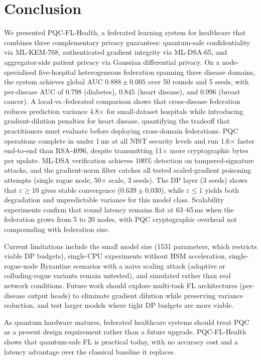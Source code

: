 \documentclass[runningheads]{llncs}
\begin{document}
\section{Conclusion}
\label{sec:conclusion}

We presented PQC-FL-Health, a federated learning system for healthcare
that combines three complementary privacy guarantees: quantum-safe
confidentiality via ML-KEM-768, authenticated gradient integrity via
ML-DSA-65, and aggregator-side patient privacy via Gaussian
differential privacy.
On a node-specialised five-hospital heterogeneous federation spanning
three disease domains, the system achieves global AUC
$0.888 \pm 0.005$ over 50 rounds and 5 seeds, with per-disease AUC
of $0.798$ (diabetes), $0.845$ (heart disease), and $0.996$ (breast
cancer).
A local-vs.-federated comparison shows that cross-disease federation
reduces prediction variance 4.8$\times$ for small-dataset hospitals
while introducing gradient-dilution penalties for heart disease,
quantifying the tradeoff that practitioners must evaluate before
deploying cross-domain federations.
PQC operations complete in under 1\,ms at all NIST security levels
and run 1.6$\times$ faster end-to-end than RSA-4096, despite
transmitting 11$\times$ more cryptographic bytes per update.
ML-DSA verification achieves 100\% detection on tampered-signature
attacks, and the gradient-norm filter catches all tested scaled-gradient
poisoning attempts (single rogue node, 50$\times$ scale, 3 seeds).
The DP layer (3 seeds) shows that $\varepsilon \ge 10$ gives stable
convergence ($0.639 \pm 0.030$), while $\varepsilon \le 1$ yields
both degradation and unpredictable variance for this model class.
Scalability experiments confirm that round latency remains flat at
63--65\,ms when the federation grows from 5 to 20 nodes, with PQC
cryptographic overhead not compounding with federation size.

Current limitations include the small model size (1531 parameters,
which restricts viable DP budgets), single-CPU experiments without
HSM acceleration, single-rogue-node Byzantine scenarios with a
naive scaling attack (adaptive or colluding-rogue variants remain
untested), and simulated rather than real network conditions.
Future work should explore multi-task FL architectures (per-disease
output heads) to eliminate gradient dilution while preserving
variance reduction, and test larger models where tight DP budgets
are more viable.

As quantum hardware matures, federated healthcare systems should
treat PQC as a present design requirement rather than a future
upgrade.
PQC-FL-Health shows that quantum-safe FL is practical today, with
no accuracy cost and a latency advantage over the classical baseline
it replaces.
\end{document}
